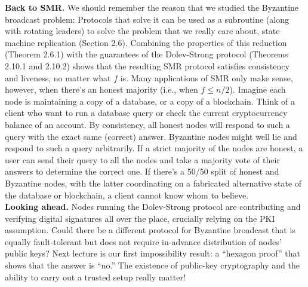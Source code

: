 \noindent
\textbf{Back to SMR.} We should remember the reason that we studied the Byzantine broadcast problem: Protocols that solve it can be used as a subroutine (along with rotating leaders) to solve the problem that we really care about, state machine replication (Section 2.6). Combining the
properties of this reduction (Theorem 2.6.1) with the guarantees of the Dolev-Strong protocol
(Theorems 2.10.1 and 2.10.2) shows that the resulting SMR protocol satisfies consistency and
liveness, no matter what $f$ is.
Many applications of SMR only make sense, however, when there’s an honest majority
(i.e., when $f \leq n/2$). Imagine each node is maintaining a copy of a database, or a copy
of a blockchain. Think of a client who want to run a database query or check the current
cryptocurrency balance of an account. By consistency, all honest nodes will respond to such
a query with the exact same (correct) answer. Byzantine nodes might well lie and respond
to such a query arbitrarily. If a strict majority of the nodes are honest, a user can send their
query to all the nodes and take a majority vote of their answers to determine the correct one. If there’s a 50/50 split of honest and Byzantine nodes, with the latter coordinating on
a fabricated alternative state of the database or blockchain, a client cannot know whom to
believe.\\

\noindent
\textbf{Looking ahead.} Nodes running the Dolev-Strong protocol are contributing and verifying
digital signatures all over the place, crucially relying on the PKI assumption. Could there
be a different protocol for Byzantine broadcast that is equally fault-tolerant but does not
require in-advance distribution of nodes’ public keys? Next lecture is our first impossibility
result: a “hexagon proof” that shows that the answer is “no.” The existence of public-key
cryptography and the ability to carry out a trusted setup really matter!


